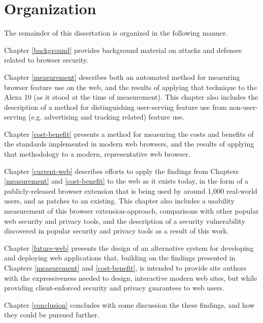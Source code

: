 \section{Organization}
\label{intro:organization}

The remainder of this dissertation is organized in the following manner.

Chapter \ref{background} provides background material on attacks and defenses
related to browser security.

Chapter \ref{measurement} describes both an automated method for measuring
browser feature use on the web, and the results of applying that technique
to the Alexa 10 (as it stood at the time of measurement).  This chapter
also includes the description of a method for distinguishing user-serving
feature use from non-user-serving (e.g. advertising and tracking related)
feature use.

Chapter \ref{cost-benefit} presents a method for measuring the costs and
benefits of the \WAPI standards implemented in modern web browsers, and
the results of applying that methodology to a modern, representative web
browser.

Chapter \ref{current-web} describes efforts to apply the findings from
Chapters \ref{measurement} and \ref{cost-benefit} to the web as it exists today,
in the form of a publicly-released browser extension that is being
used by around 1,000 real-world users, and as patches to an existing.
This chapter also includes a usability measurement of this browser
extension-approach, comparisons with other popular web security and privacy
tools, and the description of a security vulnerability discovered in popular
security and privacy tools as a result of this work.

Chapter \ref{future-web} presents the design of an alternative system for developing
and deploying web applications that, building on the findings presented in
Chapters \ref{measurement} and \ref{cost-benefit}, is intended to provide
site authors with the expressiveness needed to design, interactive modern web
sites, but while providing client-enforced security and privacy guarantees to
web users.

Chapter \ref{conclusion} concludes with some discussion the these findings, and
how they could be pursued further.
